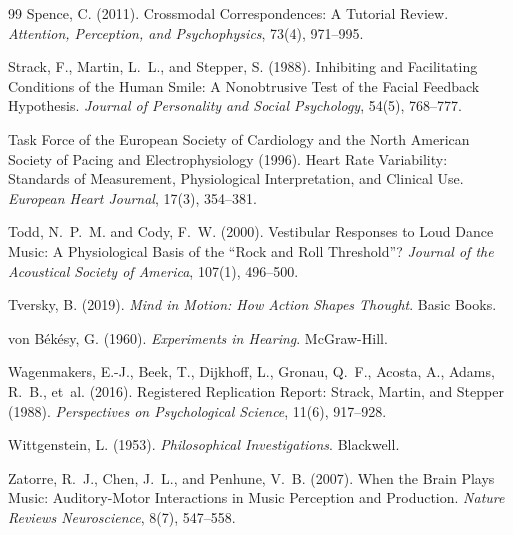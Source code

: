 \documentclass[11pt]{article}
\theoremstyle{plain}
\theoremstyle{definition}
\begin{document}
\begin{thebibliography}{99}
Spence, C. (2011).
Crossmodal Correspondences: A Tutorial Review.
\textit{Attention, Perception, and Psychophysics}, 73(4), 971--995.

Strack, F., Martin, L.~L., and Stepper, S. (1988).
Inhibiting and Facilitating Conditions of the Human Smile: A Nonobtrusive Test of the Facial Feedback Hypothesis.
\textit{Journal of Personality and Social Psychology}, 54(5), 768--777.

Task Force of the European Society of Cardiology and the North American Society of Pacing and Electrophysiology (1996).
Heart Rate Variability: Standards of Measurement, Physiological Interpretation, and Clinical Use.
\textit{European Heart Journal}, 17(3), 354--381.

Todd, N.~P.~M. and Cody, F.~W. (2000).
Vestibular Responses to Loud Dance Music: A Physiological Basis of the ``Rock and Roll Threshold''?
\textit{Journal of the Acoustical Society of America}, 107(1), 496--500.

Tversky, B. (2019).
\textit{Mind in Motion: How Action Shapes Thought}.
Basic Books.

von B\'ek\'esy, G. (1960).
\textit{Experiments in Hearing}.
McGraw-Hill.

Wagenmakers, E.-J., Beek, T., Dijkhoff, L., Gronau, Q.~F., Acosta, A., Adams, R.~B., et~al. (2016).
Registered Replication Report: Strack, Martin, and Stepper (1988).
\textit{Perspectives on Psychological Science}, 11(6), 917--928.

Wittgenstein, L. (1953).
\textit{Philosophical Investigations}.
Blackwell.

Zatorre, R.~J., Chen, J.~L., and Penhune, V.~B. (2007).
When the Brain Plays Music: Auditory-Motor Interactions in Music Perception and Production.
\textit{Nature Reviews Neuroscience}, 8(7), 547--558.

\end{thebibliography}
\end{document}
